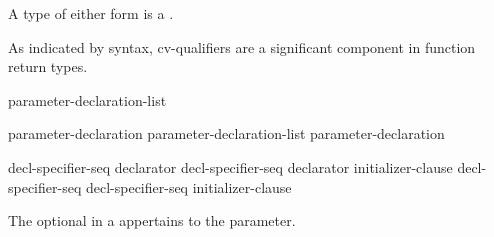 \pnum
{}%
A type of either form is a .%
\begin{footnote}
As indicated by syntax, cv-qualifiers are a significant component in function return types.
\end{footnote}

%
\begin{bnf}
\br
     \br
    parameter-declaration-list \terminal{,} 
\end{bnf}

\begin{bnf}
\br
    parameter-declaration\br
    parameter-declaration-list \terminal{,} parameter-declaration
\end{bnf}

\begin{bnf}
\br
     decl-specifier-seq declarator\br
     decl-specifier-seq declarator \terminal{=} initializer-clause\br
     decl-specifier-seq \br
     decl-specifier-seq  \terminal{=} initializer-clause
\end{bnf}

The optional  in a 
appertains to the parameter.

